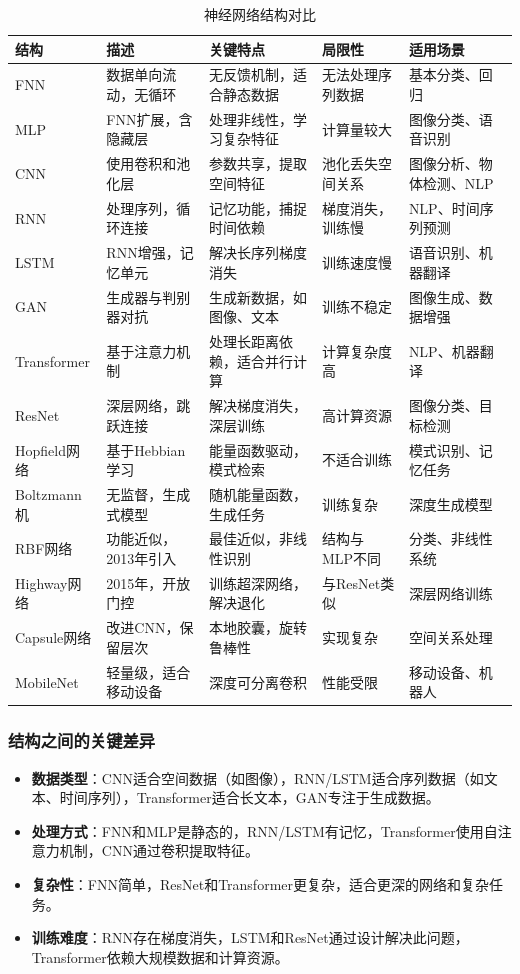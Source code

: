 \documentclass[UTF8]{report}
\theoremstyle{MyLineTheoremStyle} %
\theoremstyle{MyBlockTheoremStyle} %
\theoremstyle{MySubsubsectionStyle} %
\begin{document}
\begin{table}[h]
\centering
\caption{神经网络结构对比}
\begin{tabular}{l p{3.5cm} p{4cm} p{3cm} p{3cm}}
\toprule
\textbf{结构} & \textbf{描述} & \textbf{关键特点} & \textbf{局限性} & \textbf{适用场景} \\
\midrule
FNN & 数据单向流动，无循环 & 无反馈机制，适合静态数据 & 无法处理序列数据 & 基本分类、回归 \\
MLP & FNN扩展，含隐藏层 & 处理非线性，学习复杂特征 & 计算量较大 & 图像分类、语音识别 \\
CNN & 使用卷积和池化层 & 参数共享，提取空间特征 & 池化丢失空间关系 & 图像分析、物体检测、NLP \\
RNN & 处理序列，循环连接 & 记忆功能，捕捉时间依赖 & 梯度消失，训练慢 & NLP、时间序列预测 \\
LSTM & RNN增强，记忆单元 & 解决长序列梯度消失 & 训练速度慢 & 语音识别、机器翻译 \\
GAN & 生成器与判别器对抗 & 生成新数据，如图像、文本 & 训练不稳定 & 图像生成、数据增强 \\
Transformer & 基于注意力机制 & 处理长距离依赖，适合并行计算 & 计算复杂度高 & NLP、机器翻译 \\
ResNet & 深层网络，跳跃连接 & 解决梯度消失，深层训练 & 高计算资源 & 图像分类、目标检测 \\
Hopfield网络 & 基于Hebbian学习 & 能量函数驱动，模式检索 & 不适合训练 & 模式识别、记忆任务 \\
Boltzmann机 & 无监督，生成式模型 & 随机能量函数，生成任务 & 训练复杂 & 深度生成模型 \\
RBF网络 & 功能近似，2013年引入 & 最佳近似，非线性识别 & 结构与MLP不同 & 分类、非线性系统 \\
Highway网络 & 2015年，开放门控 & 训练超深网络，解决退化 & 与ResNet类似 & 深层网络训练 \\
Capsule网络 & 改进CNN，保留层次 & 本地胶囊，旋转鲁棒性 & 实现复杂 & 空间关系处理 \\
MobileNet & 轻量级，适合移动设备 & 深度可分离卷积 & 性能受限 & 移动设备、机器人 \\
\bottomrule
\end{tabular}
\end{table}

\subsubsection{结构之间的关键差异}
\begin{itemize}
    \item \textbf{数据类型}：CNN适合空间数据（如图像），RNN/LSTM适合序列数据（如文本、时间序列），Transformer适合长文本，GAN专注于生成数据。
    \item \textbf{处理方式}：FNN和MLP是静态的，RNN/LSTM有记忆，Transformer使用自注意力机制，CNN通过卷积提取特征。
    \item \textbf{复杂性}：FNN简单，ResNet和Transformer更复杂，适合更深的网络和复杂任务。
    \item \textbf{训练难度}：RNN存在梯度消失，LSTM和ResNet通过设计解决此问题，Transformer依赖大规模数据和计算资源。
\end{itemize}
\end{document}
